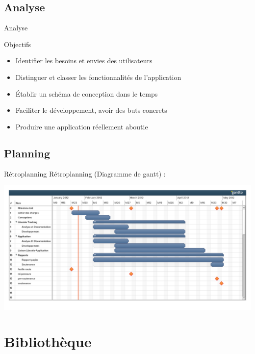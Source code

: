 \documentclass{beamer}
\begin{document}
	\subsection{Analyse}
		\begin{frame}{Analyse}
			\begin{exampleblock}{Objectifs}
				\begin{itemize}
					\item{Identifier les besoins et envies des utilisateurs}
					\item{Distinguer et classer les fonctionnalités de l'application}
					\item{Établir un schéma de conception dans le temps}
					\item{Faciliter le développement, avoir des buts concrets}
					\item{Produire une application réellement aboutie}
				\end{itemize}
			\end{exampleblock}
		\end{frame}
	
	\subsection{Planning}
		\begin{frame}{Rétroplanning}	
			Rétroplanning (Diagramme de gantt) :
			\begin{center}
			\includegraphics[scale=0.25]{../feuille-route/retroplanning.pdf}
			\end{center}
		\end{frame}

	\section{Bibliothèque}
\end{document}
